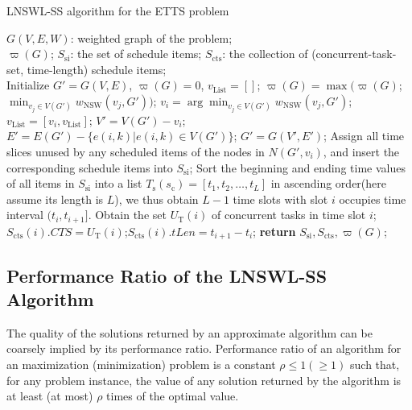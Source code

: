 \documentclass[journal,10pt]{IEEEtran}
\begin{document}
\begin{algorithm}[!htb]
\caption{LNSWL-SS algorithm for the ETTS problem}
\begin{algorithmic}[1]\label{Alg_LNSWL_SS}
    \REQUIRE $G(V,E,W)$: weighted graph of the problem;\\
    \ENSURE $\varpi(G)$; $S_\text{si}$: the set of schedule items;
    $S_\text{cts}$: the collection of (concurrent-task-set, time-length) schedule items;\\
    \STATE Initialize $G'{=}G(V,E)$, $\varpi(G){=}0$, $v_\text{List}{=}[ ]$;
    \label{seqbegin}
        \STATE $\varpi(G){=}\max(\varpi(G)$;$\min_{v_j{\in}V(G')}w_\text{NSW}(v_j,G'))$;\label{v_update}
        \STATE $v_i{=}\arg\min_{v_j{\in}V(G')}w_\text{NSW}(v_j,G')$; $v_\text{List}=[v_i,v_\text{List}]$;
        \STATE $V'{=}V(G'){-}v_i$; $E'{=}E(G'){-}\{e(i,k)|e(i,k){\in}V(G')\}$;
        \STATE $G'{=}G(V',E')$;
    \ENDWHILE \label{seqend}
     \label{schbegin}
        \STATE Assign all time slices unused by any scheduled items of the nodes in $N(G',v_i)$, and insert the corresponding schedule items into $S_\text{si}$;
    \ENDFOR \label{schend}
    \STATE Sort the beginning and ending time values of all items in $S_\text{si}$ into a list $T_\text{s}(s_\text{c}){=}[t_1,t_2,\ldots,t_{L}]$ in ascending order(here assume its length is $L$), we thus obtain $L{-}1$ time slots with slot $i$ occupies time interval $(t_{i},t_{i{+}1}]$.\label{ctsbegin}
        \STATE Obtain the set $U_\text{T}(i)$ of concurrent tasks in time slot $i$;
        \STATE $S_\text{cts}(i).CTS{=}U_\text{T}(i)$;$S_\text{cts}(i).tLen{=}t_{i{+}1}{-}t_{i}$;
    \ENDFOR \label{ctsend}
    \STATE \textbf{return} $S_\text{si}, S_\text{cts}, \varpi(G)$;
\end{algorithmic}
\end{algorithm}

\subsection{Performance Ratio of the LNSWL-SS Algorithm}

The quality of the solutions returned by an approximate algorithm can be coarsely implied by its performance ratio. Performance ratio of an algorithm for an maximization (minimization) problem is a constant $\rho{\leq}1({\geq}1)$ such that, for any problem instance, the value of any solution returned by the algorithm is at least (at most) ${\rho}$ times of the optimal value.
\end{document}
